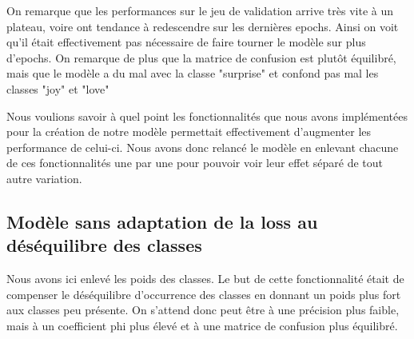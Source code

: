 \documentclass{article}
\begin{document}
On remarque que les performances sur le jeu de validation arrive très vite à un plateau, voire ont tendance à redescendre sur les dernières epochs. Ainsi on voit qu'il était effectivement pas nécessaire de faire tourner le modèle sur plus d'epochs. 
On remarque de plus que la matrice de confusion est plutôt équilibré, mais que le modèle a du mal avec la classe "surprise" et confond pas mal les classes "joy" et "love"




Nous voulions savoir à quel point les fonctionnalités que nous avons implémentées pour la création de notre modèle permettait effectivement d'augmenter les performance de celui-ci.
Nous avons donc relancé le modèle en enlevant chacune de ces fonctionnalités une par une pour pouvoir voir leur effet séparé de tout autre variation.
\subsection{Modèle sans adaptation de la loss au déséquilibre des classes}
Nous avons ici enlevé les poids des classes.
Le but de cette fonctionnalité était de compenser le déséquilibre d'occurrence des classes en donnant un poids plus fort aux classes peu présente.
On s'attend donc peut être à une précision plus faible, mais à un coefficient phi plus élevé et à une matrice de confusion plus équilibré.
\end{document}
